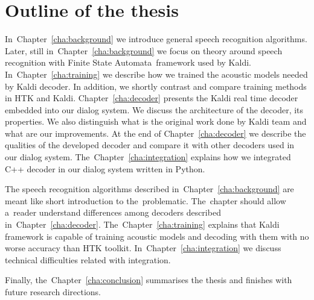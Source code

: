 
\section{Outline of the thesis} 
\label{sec:outline_of_the_thesis}
In~Chapter~\ref{cha:background} we introduce general speech recognition algorithms. Later, still in~Chapter~\ref{cha:background} we focus on theory around speech recognition with Finite State Automata~framework used by Kaldi. In~Chapter~\ref{cha:training} we describe how we trained the acoustic models needed by Kaldi decoder. In addition, we shortly contrast and compare training methods in HTK and Kaldi. Chapter~\ref{cha:decoder} presents the Kaldi real time decoder embedded into our dialog system. We discuss the architecture of the decoder, its properties. We also distinguish what is the original work done by Kaldi team and what are our improvements. At the end of Chapter~\ref{cha:decoder} we describe the qualities of the developed decoder and compare it with other decoders used in our dialog system.
The~Chapter~\ref{cha:integration} explains how we integrated C++ decoder in our dialog system written in Python.
    
The speech recognition algorithms described in~Chapter~\ref{cha:background} are meant like short introduction to the~problematic. The~chapter should allow a~reader understand differences among decoders described in~Chapter~\ref{cha:decoder}. The~Chapter~\ref{cha:training} explains that Kaldi framework is capable of training acoustic models and decoding with them with no worse accuracy than HTK toolkit. In~Chapter~\ref{cha:integration} we discuss technical difficulties related with integration. 

Finally, the~Chapter~\ref{cha:conclusion} summarises the thesis and finishes with future research directions.

